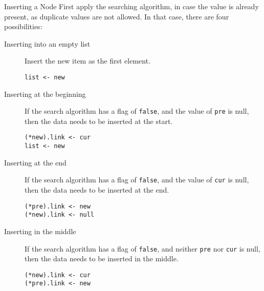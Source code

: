 \documentclass[\main/notes.tex]{subfiles}
\begin{document}
				\begin{definition}{Inserting a Node}
					First apply the searching algorithm, in case the value is already present, as duplicate values are not allowed. In that case, there are four possibilities:
					\begin{indentparagraph}
						\begin{description}
							\item[Inserting into an empty list] Insert the new item as the first element.
								\begin{lstlisting}
list <- new
								\end{lstlisting}
							\item[Inserting at the beginning] If the search algorithm has a flag of \texttt{false}, and the value of \texttt{pre} is null, then the data needs to be inserted at the start.
								\begin{lstlisting}
(*new).link <- cur
list <- new
								\end{lstlisting}
							\item[Inserting at the end] If the search algorithm has a flag of \texttt{false}, and the value of \texttt{cur} is null, then the data needs to be inserted at the end.
								\begin{lstlisting}
(*pre).link <- new
(*new).link <- null
								\end{lstlisting}
							\item[Inserting in the middle] If the search algorithm has a flag of \texttt{false}, and neither \texttt{pre} nor \texttt{cur} is null, then the data needs to be inserted in the middle.
								\begin{lstlisting}
(*new).link <- cur
(*pre).link <- new
								\end{lstlisting}
						\end{description}
					\end{indentparagraph}
				\end{definition}
				\pagebreak
\end{document}
